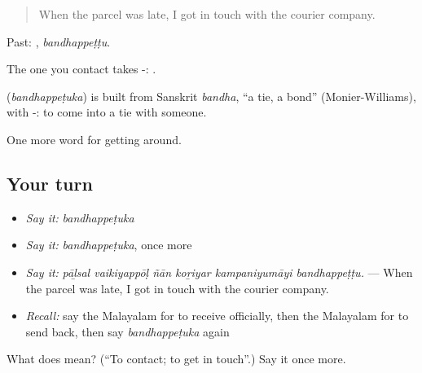 \begin{quote}
When the parcel was late, I got in touch with the courier company.
\end{quote}

Past: , \emph{bandhappeṭṭu}.

The one you contact takes -:  .

\begin{cousinweb}
\textbf{} (\emph{bandhappeṭuka}) is built from Sanskrit \emph{bandha}, \textquotedblleft{}a tie, a bond\textquotedblright{} (Monier-Williams), with -: to come into a tie with someone.
\end{cousinweb}

\begin{grammarlens}[title={What you've built}]
One more word for getting around.
\end{grammarlens}

\subsection*{Your turn}
\begin{itemize}
\raggedright
  \item \emph{Say it:} \emph{bandhappeṭuka}
  \item \emph{Say it:} \emph{bandhappeṭuka}, once more
  \item \emph{Say it:} \emph{pāḻsal vaikiyappōḷ ñān koṟiyar kampaniyumāyi bandhappeṭṭu.} — When the parcel was late, I got in touch with the courier company.
  \item \emph{Recall:} say the Malayalam for to receive officially, then the Malayalam for to send back, then say \emph{bandhappeṭuka} again
\end{itemize}

\begin{tcolorbox}[breakable,colback=teal!4,colframe=teal!35!black,title={Before you move on}]
What does  mean? (\textquotedblleft{}To contact; to get in touch\textquotedblright{}.) Say it once more.
\end{tcolorbox}

